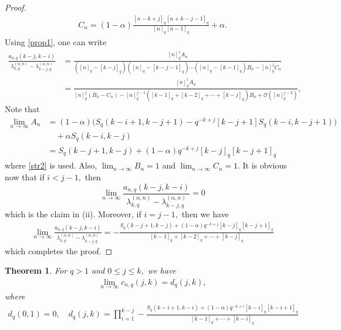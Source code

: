 \documentclass[12pt]{article}
\numberwithin{equation}{section} \theoremstyle{plain}
\newtheorem{theorem}{Theorem}[section]
\theoremstyle{definition}
\theoremstyle{remark}
\begin{document}
\begin{proof}
\begin{align*}
C_n=(1-\alpha)\frac{[n-k+j]_q[n+k-j-1]_q}{[n]_q[n-1]_q}+\alpha.
\end{align*}
Using \eqref{prop1}, one can write
\begin{align*}
\frac{a_{n,q}(k-j,k-i)}{\lambda_{k,q}^{(\alpha,n)}-\lambda_{k-j,q}^{(\alpha,n)}}&=\frac{[n]_q^iA_n}{([n]_q-[k-j]_q)([n]_q-[k-j-1]_q)\cdots([n]_q-[k-1]_q)B_n-[n]_q^jC_n}\\
&=\frac{[n]_q^iA_n}{[n]_q^j(B_n-C_n)-[n]_q^{j-1}([k-1]_q+[k-2]_q+\cdots+[k-j]_q)B_n+\mathcal{O}([n]_q^{j-2})},
\end{align*}
Note that 
\begin{align*}
\lim_{n\rightarrow\infty}A_n&=(1-\alpha)\big(S_q(k-i+1,k-j+1)-q^{-k+j}[k-j+1]S_q(k-i,k-j+1)\big)\\
&\quad+\alpha S_q(k-i,k-j)\\
&=S_q(k-j+1,k-j)+(1-\alpha)q^{-k+j}[k-j]_q[k-j+1]_q
\end{align*}
where \eqref{str2} is used. Also,
$\lim_{n\rightarrow\infty}B_n=1$ and $\lim_{n\rightarrow\infty}C_n=1$. 
It is obvious now that if $i<j-1,$ then 
$$
\lim_{n\to \infty} \frac{a_{n,q}(k-j,k-i)}{\lambda_{k,q}^{(\alpha,n)}-\lambda_{k-j,q}^{(\alpha,n)}}=0
$$
which is the claim in (ii).
Moreover, if $i=j-1,$ then we have 
\begin{align*}
\lim_{n\to \infty} \frac{a_{n,q}(k-j,k-i)}{\lambda_{k,q}^{(\alpha,n)}-\lambda_{k-j,q}^{(\alpha,n)}}=-\frac{S_q(k-j+1,k-j)+(1-\alpha)q^{-k+j}[k-j]_q[k-j+1]_q}{[k-1]_q+[k-2]_q+\cdots+[k-j]_q}
\end{align*}
which completes the proof.
\end{proof}

\begin{theorem}
For $q > 1$ and $0\leq j \leq k,$ we have
\begin{eqnarray*}
\lim_{n\to\infty} c_{n,q}(j,k)=d_q(j,k), 
\end{eqnarray*}
where
\begin{eqnarray*}
d_q(0, 1)= 0, \quad d_q(j,k)=\prod_{i=1}^{k-j}-\frac{S_q(k-i+1, k-i)+(1-\alpha)q^{-k+i}[k-i]_q[k-i+1]_q}{[k-1]_q+\cdots+[k-i]_q}
\end{eqnarray*}
\end{theorem}
\end{document}
